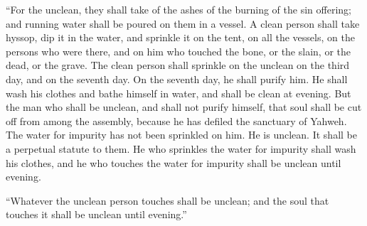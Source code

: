 {\par }{\PP {}“For the unclean, they shall take of the ashes of the burning of the sin offering; and running water shall be poured on them in a vessel.
A clean person shall take hyssop, dip it in the water, and sprinkle it on the tent, on all the vessels, on the persons who were there, and on him who touched the bone, or the slain, or the dead, or the grave.
The clean person shall sprinkle on the unclean on the third day, and on the seventh day. On the seventh day, he shall purify him. He shall wash his clothes and bathe himself in water, and shall be clean at evening.
But the man who shall be unclean, and shall not purify himself, that soul shall be cut off from among the assembly, because he has defiled the sanctuary of Yahweh. The water for impurity has not been sprinkled on him. He is unclean.
It shall be a perpetual statute to them. He who sprinkles the water for impurity shall wash his clothes, and he who touches the water for impurity shall be unclean until evening.
\par }{\PP {}“Whatever the unclean person touches shall be unclean; and the soul that touches it shall be unclean until evening.”

}
